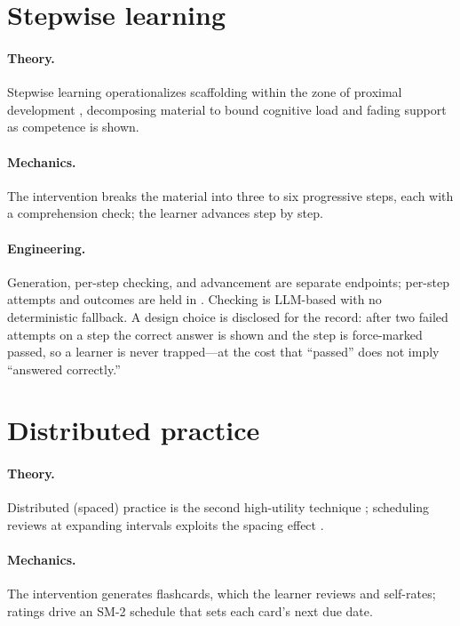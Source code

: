\section{Stepwise learning}
\label{sec:interventions-sl}

\paragraph{Theory.} Stepwise learning operationalizes scaffolding
\citep{wood1976, vandepol2010} within the zone of proximal development
\citep{vygotsky1978}, decomposing material to bound cognitive load
\citep{sweller1988} and fading support as competence is shown.

\paragraph{Mechanics.} The intervention breaks the material into three to
six progressive steps, each with a comprehension check; the learner
advances step by step.

\paragraph{Engineering.} Generation, per-step checking, and advancement
are separate endpoints; per-step attempts and outcomes are held in
. Checking is LLM-based with no deterministic fallback.
A design choice is disclosed for the record: after two failed attempts on
a step the correct answer is shown and the step is force-marked passed, so
a learner is never trapped---at the cost that ``passed'' does not imply
``answered correctly.''

\section{Distributed practice}
\label{sec:interventions-dp}

\paragraph{Theory.} Distributed (spaced) practice is the second
high-utility technique \citep{dunlosky2013, cepeda2006}; scheduling
reviews at expanding intervals exploits the spacing effect
\citep{bjork1994}.

\paragraph{Mechanics.} The intervention generates flashcards, which the
learner reviews and self-rates; ratings drive an SM-2 schedule
\citep{wozniak1994} that sets each card's next due date.

